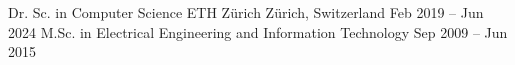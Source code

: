 \cvtitlecontentspacing
\vspace{-.3mm}
\begin{cventries}
  \cventry
    {Dr. Sc. in Computer Science}
    {ETH Zürich}
    {Zürich, Switzerland}
    {Feb 2019 -- Jun 2024}
    {}%
\vspace{.4mm}%
  \cventry
    {M.Sc. in Electrical Engineering and Information Technology}
    {}
    {}
    {Sep 2009 -- Jun 2015}
    {}
\vspace{-3.5mm}
\end{cventries}
